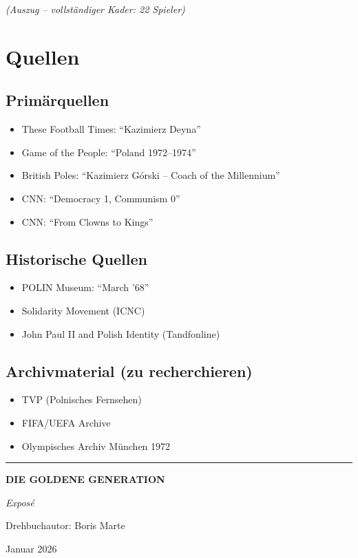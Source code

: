 \documentclass[11pt,a4paper]{book}
\begin{document}
\textit{(Auszug -- vollständiger Kader: 22 Spieler)}

\chapter{Quellen}

\section{Primärquellen}

\begin{itemize}
    \item These Football Times: ``Kazimierz Deyna''
    \item Game of the People: ``Poland 1972--1974''
    \item British Poles: ``Kazimierz Górski -- Coach of the Millennium''
    \item CNN: ``Democracy 1, Communism 0''
    \item CNN: ``From Clowns to Kings''
\end{itemize}

\section{Historische Quellen}

\begin{itemize}
    \item POLIN Museum: ``March '68''
    \item Solidarity Movement (ICNC)
    \item John Paul II and Polish Identity (Tandfonline)
\end{itemize}

\section{Archivmaterial (zu recherchieren)}

\begin{itemize}
    \item TVP (Polnisches Fernsehen)
    \item FIFA/UEFA Archive
    \item Olympisches Archiv München 1972
\end{itemize}


\vfill
\begin{center}
\rule{0.5\textwidth}{0.4pt}

\vspace{0.5cm}

\textbf{DIE GOLDENE GENERATION}

\textit{Exposé}

\vspace{0.3cm}

Drehbuchautor: Boris Marte

Januar 2026

\end{center}
\end{document}
